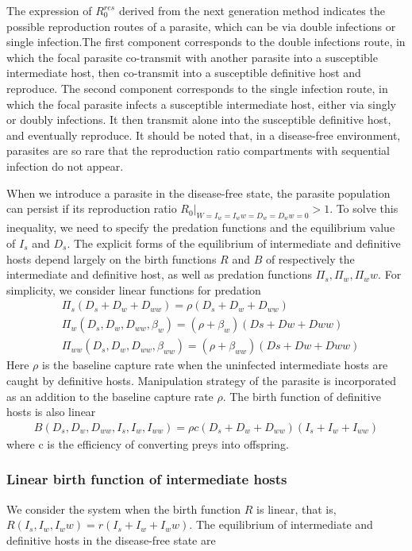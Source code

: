 \documentclass{article}
\begin{document}
The expression of $R^{res}_0$ derived from the next generation method indicates the possible reproduction routes of a parasite, which can be via double infections or single infection.The first component corresponds to the double infections route, in which the focal parasite co-transmit with another parasite into a susceptible intermediate host, then co-transmit into a susceptible definitive host and reproduce. The second component corresponds to the single infection route, in which the focal parasite infects a susceptible intermediate host, either via singly or doubly infections. It then transmit alone into the susceptible definitive host, and eventually reproduce. It should be noted that, in a disease-free environment, parasites are so rare that the reproduction ratio compartments with sequential infection do not appear. 


When we introduce a parasite in the disease-free state, the parasite population can persist if its reproduction ratio $R_0|_{W = I_w = I_ww = D_w = D_ww = 0} > 1$. To solve this inequality, we need to specify the predation functions and the equilibrium value of $I_s$ and $D_s$. The explicit forms of the equilibrium of intermediate and definitive hosts depend largely on the birth functions $R$ and $B$ of respectively the intermediate and definitive host, as well as predation functions $\Pi_s, \Pi_w, \Pi_ww$. For simplicity, we consider linear functions for predation 
\begin{align*}
& \Pi_s(D_s + D_w + D_{ww}) = \rho (D_s + D_w + D_{ww}) \\
& \Pi_w(D_s, D_w, D_{ww}, \beta_w) = (\rho + \beta_w) (Ds + Dw + Dww) \\
& \Pi_{ww}(D_s, D_w, D_{ww}, \beta_{ww}) = (\rho + \beta_{ww}) (Ds + Dw + Dww)
\end{align*}
Here $\rho$ is the baseline capture rate when the uninfected intermediate hosts are caught by definitive hosts. Manipulation strategy of the parasite is incorporated as an addition to the baseline capture rate $\rho$. The birth function of definitive hosts is also linear
\begin{align*}
B(D_s, D_w, D_{ww}, I_s, I_w, I_{ww}) = \rho c (D_s + D_w + D_{ww}) (I_s + I_w + I_{ww})
\end{align*}
where c is the efficiency of converting preys into offspring.

\subsubsection{Linear birth function of intermediate hosts}
We consider the system when the birth function $R$ is linear, that is, $R(I_s, I_w, I_ww) = r(I_s + I_w + I_ww)$. The equilibrium of intermediate and definitive hosts in the disease-free state are
\end{document}
